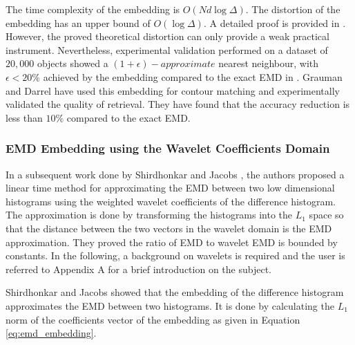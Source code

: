 \iftoggle{edit-mode}{\hspace{0pt}\marginpar{Performance}}{} 
The time complexity of the embedding is $O(Nd \log{\Delta})$. 
The distortion of the embedding has an upper bound of $O(\log \Delta)$. 
A detailed proof is provided in \cite{indyk2003fast}. 
However, the proved theoretical distortion can only provide a weak practical instrument. 
Nevertheless, experimental validation performed on a dataset of $20,000$ objects showed a $(1+\epsilon)-approximate$ nearest neighbour, with $\epsilon < 20\%$ achieved by the embedding compared to the exact EMD in \cite{indyk2003fast}. 
Grauman and Darrel \cite{grauman2004fast} have used this embedding for contour matching and experimentally validated the quality of retrieval. 
They have found that the accuracy reduction is less than $10\%$ compared to the exact EMD.

\subsubsection{EMD Embedding using the Wavelet Coefficients Domain}

\iftoggle{edit-mode}{\hspace{0pt}\marginpar{Wavelet embedding}}{}
In a subsequent work done by Shirdhonkar and Jacobs \cite{shirdhonkar2008approximate}, the authors proposed a linear time method for approximating the EMD between two low dimensional histograms using the weighted wavelet coefficients of the difference histogram. 
The approximation is done by transforming the histograms into the $L_1$ space so that the distance between the two vectors in the wavelet domain is the EMD approximation. 
They proved the ratio of EMD to wavelet EMD is bounded by constants. 
In the following, a background on wavelets is required and the user is referred to Appendix A for a brief introduction on the subject.

\iftoggle{edit-mode}{\hspace{0pt}\marginpar{EMD embedding to the wavelet domain}}{}
Shirdhonkar and Jacobs showed that the embedding of the difference histogram approximates the EMD between two histograms. 
It is done by calculating the $L_1$ norm of the coefficients vector of the embedding as given in Equation \ref{eq:emd_embedding}.

